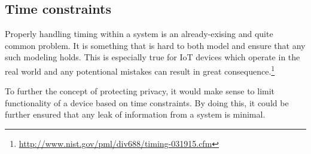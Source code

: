 \subsection{Time constraints}
Properly handling timing within a system is an already-exising and quite common problem.
It is something that is hard to both model and ensure that any such modeling holds.
This is especially true for IoT devices which operate in the real world and any potentional mistakes can result in great consequence.\footnote{\url{http://www.nist.gov/pml/div688/timing-031915.cfm}}

To further the concept of protecting privacy, it would make sense to limit functionality of a device based on time constraints.
By doing this, it could be further ensured that any leak of information from a system is minimal.
